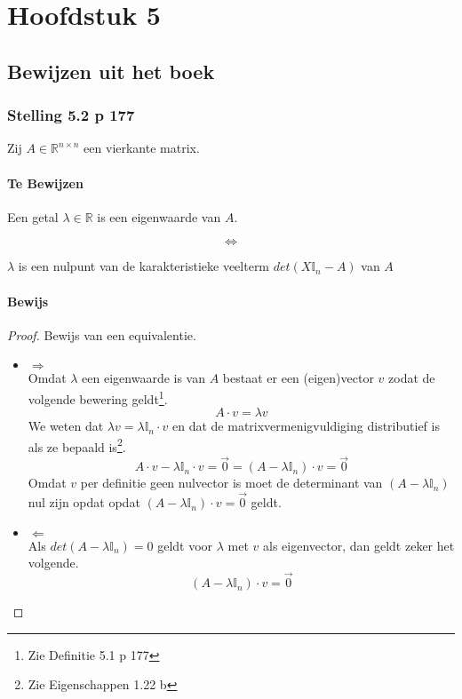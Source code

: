 \documentclass[lineaire_algebra_oplossingen.tex]{subfiles}
\begin{document}
\chapter{Hoofdstuk 5}
\section{Bewijzen uit het boek}

\subsection{Stelling 5.2 p 177}
Zij $A\in \mathbb{R}^{n\times n}$ een vierkante matrix.
\subsubsection*{Te Bewijzen}
\begin{center}
Een getal $\lambda\in\mathbb{R}$ is een eigenwaarde van $A$.
\end{center}
\[\Leftrightarrow\]
\begin{center}
$\lambda$ is een nulpunt van de karakteristieke veelterm $det(X\mathbb{I}_n - A)$ van $A$
\end{center}
\subsubsection*{Bewijs}
\begin{proof}
Bewijs van een equivalentie.
\begin{itemize}
\item $\Rightarrow$\\
Omdat $\lambda$ een eigenwaarde is van $A$ bestaat er een (eigen)vector $v$ zodat de volgende bewering geldt\footnote{Zie Definitie 5.1 p 177}.
\[
A\cdot v = \lambda v
\]
We weten dat $\lambda v =  \lambda \mathbb{I}_n \cdot v$ en dat de matrixvermenigvuldiging distributief is als ze bepaald is\footnote{Zie Eigenschappen 1.22 b}.
\[
A\cdot v - \lambda \mathbb{I}_n \cdot v = \vec{0} = (A-\lambda\mathbb{I}_n)\cdot v = \vec{0}
\]
Omdat $v$ per definitie geen nulvector is moet de determinant van $(A-\lambda\mathbb{I}_n)$ nul zijn opdat opdat $(A-\lambda\mathbb{I}_n)\cdot v = \vec{0}$ geldt.

\item $\Leftarrow$\\
Als $det(A-\lambda\mathbb{I}_n) = 0$ geldt voor $\lambda$ met $v$ als eigenvector, dan geldt zeker het volgende.
\[
(A-\lambda\mathbb{I}_n)\cdot v = \vec{0}
\]
\end{itemize}
\end{proof}
\end{document}
